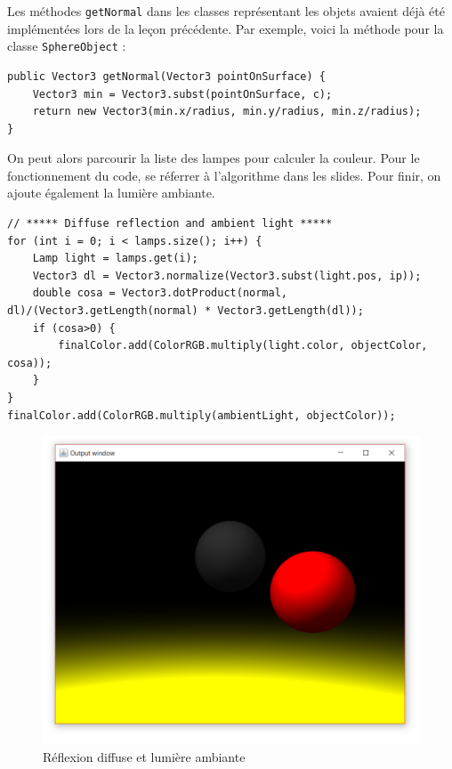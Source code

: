 Les méthodes \texttt{getNormal} dans les classes représentant les objets avaient déjà été implémentées lors de la leçon précédente. Par exemple, voici la méthode pour la classe \texttt{SphereObject} :

\begin{lstlisting}
public Vector3 getNormal(Vector3 pointOnSurface) {
    Vector3 min = Vector3.subst(pointOnSurface, c);
    return new Vector3(min.x/radius, min.y/radius, min.z/radius);
}
\end{lstlisting}

On peut alors parcourir la liste des lampes pour calculer la couleur. Pour le fonctionnement du code, se réferrer à l'algorithme dans les slides. Pour finir, on ajoute également la lumière ambiante.

\begin{lstlisting}
// ***** Diffuse reflection and ambient light *****
for (int i = 0; i < lamps.size(); i++) {
    Lamp light = lamps.get(i);
    Vector3 dl = Vector3.normalize(Vector3.subst(light.pos, ip));
    double cosa = Vector3.dotProduct(normal, dl)/(Vector3.getLength(normal) * Vector3.getLength(dl));
    if (cosa>0) {
        finalColor.add(ColorRGB.multiply(light.color, objectColor, cosa));
    }
}
finalColor.add(ColorRGB.multiply(ambientLight, objectColor));
\end{lstlisting}

\begin{figure}[H]
	\caption{\label{10_1} Réflexion diffuse et lumière ambiante}
	\centering
	\includegraphics[scale = 0.4]{10_1.png}
\end{figure}

